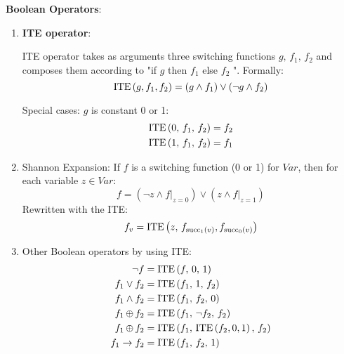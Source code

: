 \documentclass[../src/handouts/main.tex]{subfiles}
\begin{document}
\textbf{Boolean Operators}:
\begin{enumerate}
  \item \textbf{ITE operator}:

    ITE operator takes as arguments three switching functions $g,\, f_1,\, f_2$ and composes them according to "if $g$ then $f_1$ else $f_2$ ". Formally:
    \[
      \operatorname{ITE}\left(g, f_1, f_2\right) =
      \left( g \land f_1 \right) \lor \left( \neg g \land f_2 \right)
    \]

    Special cases: $g$ is constant 0 or 1:
    \begin{align*}
      \operatorname{ITE}\left( 0,\, f_1,\, f_2 \right) & = f_2 \\
      \operatorname{ITE}\left( 1,\, f_1,\, f_2 \right) & = f_1
    \end{align*}

  \item Shannon Expansion:
    If $f$ is a switching function (0 or 1) for $Var$, then for each variable $z \in Var$:
    \[
      f =
      \left( \neg z \land \left. f \right|_{z = 0} \right) \lor
      \left( z \land \left. f \right|_{z = 1} \right)
    \]
    Rewritten with the ITE:
    \[
      f_v = \operatorname{ITE}\left( z,\, f_{\operatorname{succ}_1(v)}, f_{\operatorname{succ}_0(v)} \right)
    \]

  \item Other Boolean operators by using ITE:
    \begin{align*}
      \neg f              & = \operatorname{ITE}\left( f,\, 0,\, 1 \right)                             \\
      f_1 \vee f_2        & = \operatorname{ITE}\left( f_1,\, 1,\, f_2 \right)                         \\
      f_1 \wedge f_2      & = \operatorname{ITE}\left( f_1,\, f_2,\, 0 \right)                         \\
      f_1 \operatorname{\oplus} f_2        & = \operatorname{ITE}\left( f_1,\, \neg f_2,\, f_2 \right)                  \\
      f_1 \operatorname{\oplus} f_2        & = \operatorname{ITE}\left( f_1,\, \operatorname{ITE}\left(f_2, 0,1\right),\, f_2 \right) \\
      f_1 \rightarrow f_2 & = \operatorname{ITE}\left( f_1,\, f_2,\, 1 \right)
    \end{align*}
\end{enumerate}
\end{document}
